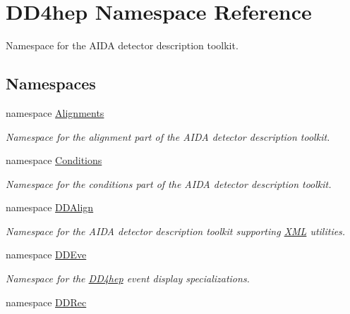 \hypertarget{namespace_d_d4hep}{
\section{DD4hep Namespace Reference}
\label{namespace_d_d4hep}
}


Namespace for the AIDA detector description toolkit.  
\subsection*{Namespaces}
\begin{DoxyCompactItemize}
\item 
namespace \hyperlink{namespace_d_d4hep_1_1_alignments}{Alignments}


\begin{DoxyCompactList}\small\item\em Namespace for the alignment part of the AIDA detector description toolkit. \item\end{DoxyCompactList}\item 
namespace \hyperlink{namespace_d_d4hep_1_1_conditions}{Conditions}


\begin{DoxyCompactList}\small\item\em Namespace for the conditions part of the AIDA detector description toolkit. \item\end{DoxyCompactList}\item 
namespace \hyperlink{namespace_d_d4hep_1_1_d_d_align}{DDAlign}


\begin{DoxyCompactList}\small\item\em Namespace for the AIDA detector description toolkit supporting \hyperlink{namespace_d_d4hep_1_1_x_m_l}{XML} utilities. \item\end{DoxyCompactList}\item 
namespace \hyperlink{namespace_d_d4hep_1_1_d_d_eve}{DDEve}


\begin{DoxyCompactList}\small\item\em Namespace for the \hyperlink{namespace_d_d4hep}{DD4hep} event display specializations. \item\end{DoxyCompactList}\item 
namespace \hyperlink{namespace_d_d4hep_1_1_d_d_rec}{DDRec}



\end{DoxyCompactItemize}
